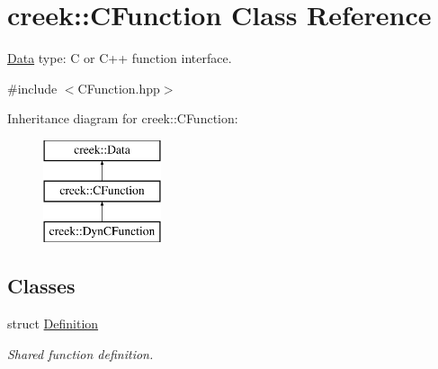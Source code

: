 \hypertarget{classcreek_1_1_c_function}{}\section{creek\+:\+:C\+Function Class Reference}
\label{classcreek_1_1_c_function}


\hyperlink{classcreek_1_1_data}{Data} type\+: C or C++ function interface.  




{\ttfamily \#include $<$C\+Function.\+hpp$>$}

Inheritance diagram for creek\+:\+:C\+Function\+:\begin{figure}[H]
\begin{center}
\leavevmode
\includegraphics[height=3.000000cm]{classcreek_1_1_c_function}
\end{center}
\end{figure}
\subsection*{Classes}
\begin{DoxyCompactItemize}
\item 
struct \hyperlink{structcreek_1_1_c_function_1_1_definition}{Definition}
\begin{DoxyCompactList}\small\item\em Shared function definition. \end{DoxyCompactList}\end{DoxyCompactItemize}

